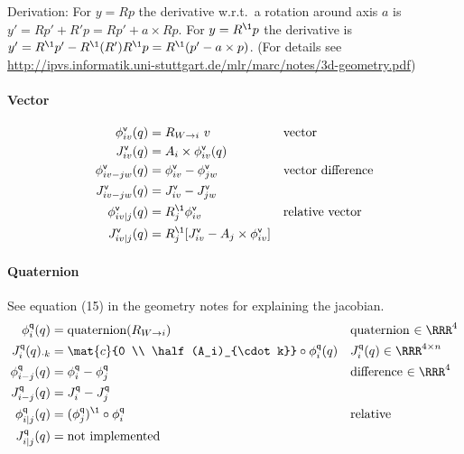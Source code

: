 \documentclass[10pt,fleqn,twoside]{article}
\newcommand{\veC}{{\textsf{v}}}
\newcommand{\quat}{{\textsf{q}}}
\newcommand{\RO}[2]{R_{{#1}\rightarrow{#2}}}
\begin{document}
{{Derivation: For $y=R p$ the derivative w.r.t.\ a rotation around axis
$a$ is $y' = R p' + R' p = R p' + a \times R p$. For $y=R^\1 p$ the
derivative is $y' = R^\1 p' - R^\1 (R') R^\1 p = R^\1 (p' - a \times
p)$.  (For details see
\url{http://ipvs.informatik.uni-stuttgart.de/mlr/marc/notes/3d-geometry.pdf})

\paragraph{Vector}

\begin{align}
\phi^\veC_{iv}(q)
 &= \RO{W}{i}~ v
 && \text{vector} \\
J^\veC_{iv}(q)
 &= A_i\times \phi^\veC_{iv}(q) \\
\phi^\veC_{iv-jw}(q)
 &= \phi^\veC_{iv} - \phi^\veC_{jw}
 && \text{vector difference} \\
J^\veC_{iv-jw}(q)
 &= J^\veC_{iv} - J^\veC_{jw} \\
\phi^\veC_{iv|j}(q)
 &= R_j^\1 \phi^\veC_{iv}
 && \text{relative vector} \\
J^\veC_{iv|j}(q)
 &= R_j^\1 [J^\veC_{iv} - A_j \times \phi^\veC_{iv}]
\end{align}


\paragraph{Quaternion}

See equation (15) in the geometry notes for explaining the jacobian.
\begin{align}
\phi^\quat_{i}(q)
 &= \text{quaternion}(\RO{W}{i})
 && \text{quaternion $\in\RRR^4$} \\
J^\quat_{i}(q)_{\cdot k}
 &= \mat{c}{0 \\ \half (A_i)_{\cdot k}} \circ \phi^\quat_{i}(q)
 && J^\quat_{i}(q)\in\RRR^{4 \times n} \\
\phi^\quat_{i-j}(q)
 &= \phi^\quat_{i} - \phi^\quat_{j}
 && \text{difference $\in\RRR^4$} \\
J^\quat_{i-j}(q)
 &= J^\quat_{i} - J^\quat_{j} \\
\phi^\quat_{i|j}(q)
 &= (\phi^\quat_{j})^\1 \circ \phi^\quat_{i}
 && \text{relative} \\
J^\quat_{i|j}(q)
 &= \text{not implemented}
\end{align}

}}
\end{document}
